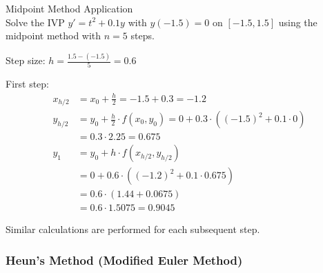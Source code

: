 \begin{example2}{Midpoint Method Application}\\
Solve the IVP $y' = t^2 + 0.1y$ with $y(-1.5) = 0$ on $[-1.5, 1.5]$ using the midpoint method with $n = 5$ steps.

Step size: $h = \frac{1.5-(-1.5)}{5} = 0.6$

First step:
\begin{align*}
x_{h/2} &= x_0 + \frac{h}{2} = -1.5 + 0.3 = -1.2\\
y_{h/2} &= y_0 + \frac{h}{2} \cdot f(x_0, y_0) = 0 + 0.3 \cdot ((-1.5)^2 + 0.1 \cdot 0)\\
&= 0.3 \cdot 2.25 = 0.675\\
y_1 &= y_0 + h \cdot f(x_{h/2}, y_{h/2})\\
&= 0 + 0.6 \cdot ((-1.2)^2 + 0.1 \cdot 0.675)\\
&= 0.6 \cdot (1.44 + 0.0675)\\
&= 0.6 \cdot 1.5075 = 0.9045
\end{align*}

Similar calculations are performed for each subsequent step.
\end{example2}

\subsubsection{Heun's Method (Modified Euler Method)}

